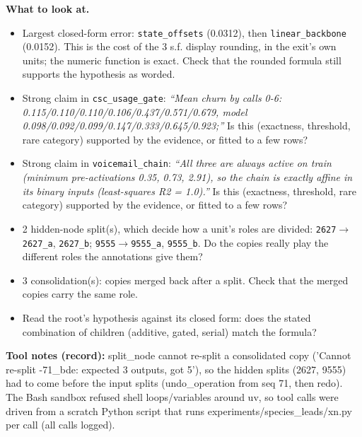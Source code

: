 \documentclass[a4paper,11pt]{article}
\begin{document}
\textbf{What to look at.}
\begin{itemize}
\item Largest closed-form error: \texttt{state\_\allowbreak{}offsets} (0.0312), then \texttt{linear\_\allowbreak{}backbone} (0.0152). This is the cost of the 3 s.f. display rounding, in the exit's own units; the numeric function is exact. Check that the rounded formula still supports the hypothesis as worded.
\item Strong claim in \texttt{csc\_\allowbreak{}usage\_\allowbreak{}gate}: \emph{``Mean churn by calls 0-6: 0.115/\allowbreak{}0.110/\allowbreak{}0.110/\allowbreak{}0.106/\allowbreak{}0.437/\allowbreak{}0.571/\allowbreak{}0.679,\allowbreak{} model 0.098/\allowbreak{}0.092/\allowbreak{}0.099/\allowbreak{}0.147/\allowbreak{}0.333/\allowbreak{}0.645/\allowbreak{}0.923;\allowbreak{}''} Is this (exactness, threshold, rare category) supported by the evidence, or fitted to a few rows?
\item Strong claim in \texttt{voicemail\_\allowbreak{}chain}: \emph{``All three are always active on train (minimum pre-activations 0.35, 0.73, 2.91), so the chain is exactly affine in its binary inputs (least-squares R2 = 1.0).''} Is this (exactness, threshold, rare category) supported by the evidence, or fitted to a few rows?
\item 2 hidden-node split(s), which decide how a unit's roles are divided: \texttt{2627}$\to$\texttt{2627\_\allowbreak{}a}, \texttt{2627\_\allowbreak{}b}; \texttt{9555}$\to$\texttt{9555\_\allowbreak{}a}, \texttt{9555\_\allowbreak{}b}. Do the copies really play the different roles the annotations give them?
\item 3 consolidation(s): copies merged back after a split. Check that the merged copies carry the same role.
\item Read the root's hypothesis against its closed form: does the stated combination of children (additive, gated, serial) match the formula?
\end{itemize}
\textbf{Tool notes (record):} split\_\allowbreak{}node cannot re-split a consolidated copy ('Cannot re-split -71\_\allowbreak{}bde: expected 3 outputs, got 5'), so the hidden splits (2627, 9555) had to come before the input splits (undo\_\allowbreak{}operation from seq 71, then redo). The Bash sandbox refused shell loops/variables around uv, so tool calls were driven from a scratch Python script that runs experiments/\allowbreak{}species\_\allowbreak{}leads/\allowbreak{}xn.py per call (all calls logged).
\end{document}
